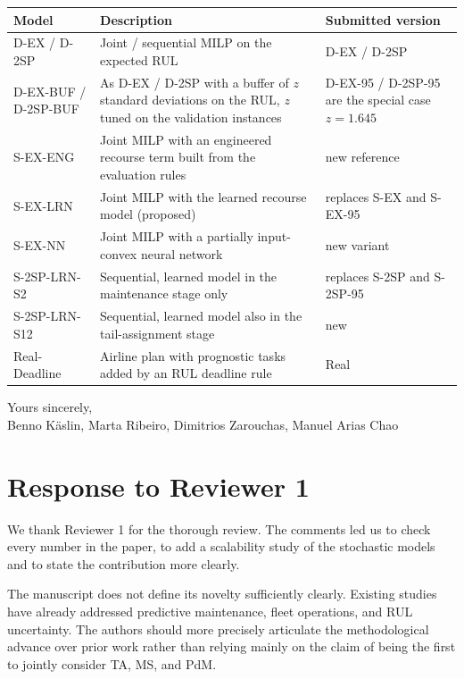 \documentclass{article}
\begin{document}
\begin{center}
\small
\begin{tabularx}{\textwidth}{@{}p{3.3cm}XX@{}}
\toprule
\textbf{Model} & \textbf{Description} & \textbf{Submitted version} \\
\midrule
D-EX / D-2SP & Joint / sequential MILP on the expected RUL & D-EX / D-2SP \\
D-EX-BUF / D-2SP-BUF & As D-EX / D-2SP with a buffer of $z$ standard deviations on the RUL, $z$ tuned on the validation instances & D-EX-95 / D-2SP-95 are the special case $z = 1.645$ \\
S-EX-ENG & Joint MILP with an engineered recourse term built from the evaluation rules & new reference \\
S-EX-LRN & Joint MILP with the learned recourse model (proposed) & replaces S-EX and S-EX-95 \\
S-EX-NN & Joint MILP with a partially input-convex neural network & new variant \\
S-2SP-LRN-S2 & Sequential, learned model in the maintenance stage only & replaces S-2SP and S-2SP-95 \\
S-2SP-LRN-S12 & Sequential, learned model also in the tail-assignment stage & new \\
Real-Deadline & Airline plan with prognostic tasks added by an RUL deadline rule & Real \\
\bottomrule
\end{tabularx}
\end{center}

\vspace{0.2cm}
Yours sincerely,\\
Benno Käslin, Marta Ribeiro, Dimitrios Zarouchas, Manuel Arias Chao



\newpage
\section{Response to Reviewer 1}

We thank Reviewer 1 for the thorough review. The comments led us to check every number in the paper, to add a scalability study of the stochastic models and to state the contribution more clearly.

\begin{cmt}{}{}
The manuscript does not define its novelty sufficiently clearly. Existing studies have already addressed predictive maintenance, fleet operations, and RUL uncertainty. The authors should more precisely articulate the methodological advance over prior work rather than relying mainly on the claim of being the first to jointly consider TA, MS, and PdM.
\end{cmt}
\end{document}
